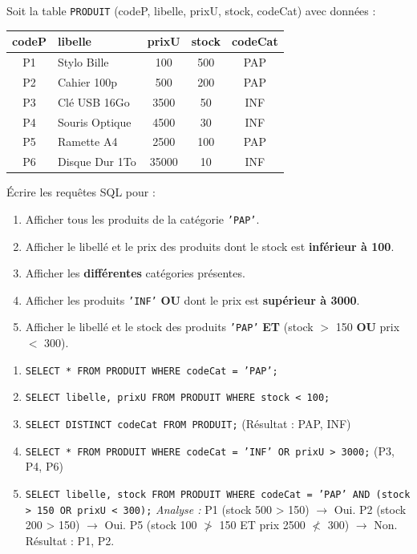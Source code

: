 \documentclass[11pt]{article}
\begin{document}
\begin{exercice}
Soit la table \texttt{PRODUIT} (codeP, libelle, prixU, stock, codeCat) avec données :
\begin{center}
\begin{tabular}{|c|l|c|c|c|}\hline
\textbf{codeP} & \textbf{libelle} & \textbf{prixU} & \textbf{stock} & \textbf{codeCat} \\\hline
P1 & Stylo Bille & 100 & 500 & PAP \\\hline
P2 & Cahier 100p & 500 & 200 & PAP \\\hline
P3 & Clé USB 16Go & 3500 & 50 & INF \\\hline
P4 & Souris Optique & 4500 & 30 & INF \\\hline
P5 & Ramette A4 & 2500 & 100 & PAP \\\hline
P6 & Disque Dur 1To & 35000 & 10 & INF \\\hline
\end{tabular}
\end{center}
Écrire les requêtes SQL pour :
\begin{enumerate}
    \item Afficher tous les produits de la catégorie \texttt{'PAP'}.
    \item Afficher le libellé et le prix des produits dont le stock est \textbf{inférieur à 100}.
    \item Afficher les \textbf{différentes} catégories présentes.
    \item Afficher les produits \texttt{'INF'} \textbf{OU} dont le prix est \textbf{supérieur à 3000}.
    \item Afficher le libellé et le stock des produits \texttt{'PAP'} \textbf{ET} (stock $>$ 150 \textbf{OU} prix $<$ 300).
\end{enumerate}
\end{exercice}

\begin{corrige}
\begin{enumerate}
    \item \texttt{SELECT * FROM PRODUIT WHERE codeCat = 'PAP';}
    \item \texttt{SELECT libelle, prixU FROM PRODUIT WHERE stock < 100;}
    \item \texttt{SELECT DISTINCT codeCat FROM PRODUIT;} (Résultat : PAP, INF)
    \item \texttt{SELECT * FROM PRODUIT WHERE codeCat = 'INF' OR prixU > 3000;} (P3, P4, P6)
    \item \texttt{SELECT libelle, stock FROM PRODUIT WHERE codeCat = 'PAP' AND (stock > 150 OR prixU < 300);} 
    \emph{Analyse :} P1 (stock 500 > 150) $\rightarrow$ Oui. P2 (stock 200 > 150) $\rightarrow$ Oui. P5 (stock 100 $\ngtr$ 150 ET prix 2500 $\nless$ 300) $\rightarrow$ Non. Résultat : P1, P2.
\end{enumerate}
\end{corrige}
\end{document}
